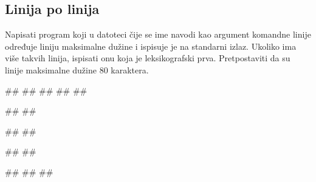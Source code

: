 

\subsection{Linija po linija}

\begin{Exercise}[label=v3_02] 
Napisati program koji u datoteci čije se ime navodi kao argument komandne linije određuje liniju maksimalne dužine i ispisuje je na standarni izlaz. Ukoliko ima više takvih linija, ispisati onu koja je leksikografski prva. Pretpostaviti da su linije maksimalne dužine 80 karaktera.\\
\begin{miditest}
\begin{upotreba}{1}
##
##
##
##
##

#\naslovIzlaz#
##
\end{upotreba}
\end{miditest}
\begin{minitest}
\begin{upotreba}{2}
##
##

#\naslovIzlaz#
##
\end{upotreba}
\end{minitest}
\begin{minitest}
\begin{upotreba}{3}
##
#\naslovIzlaz#
##
\end{upotreba}
\end{minitest}

\end{Exercise}
\begin{Answer}[ref=v3_02]
\end{Answer}

